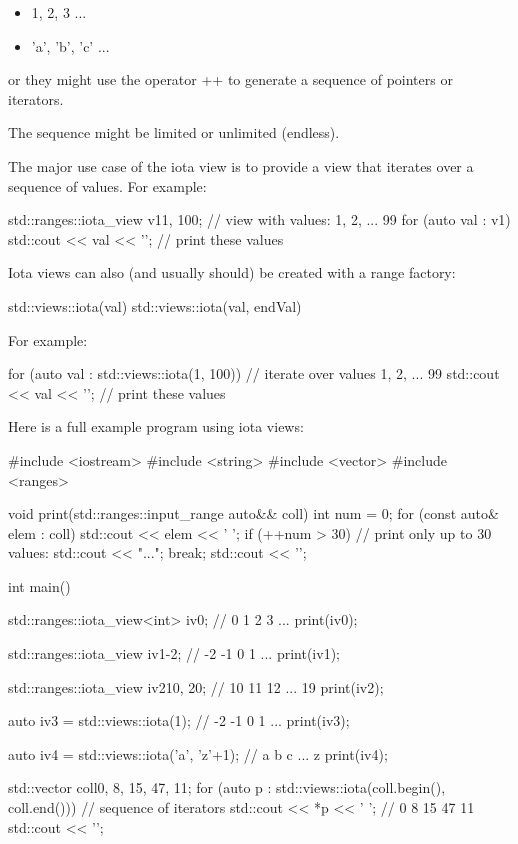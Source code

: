 \begin{itemize}
\item
1, 2, 3 ...

\item
’a’, ’b’, ’c’ ...
\end{itemize}

or they might use the operator ++ to generate a sequence of pointers or iterators.

The sequence might be limited or unlimited (endless).

The major use case of the iota view is to provide a view that iterates over a sequence of values. For example:

\begin{cpp}
std::ranges::iota_view v1{1, 100}; // view with values: 1, 2, ... 99
for (auto val : v1) {
	std::cout << val << '\n'; // print these values
}
\end{cpp}


Iota views can also (and usually should) be created with a range factory:

\begin{cpp}
std::views::iota(val)
std::views::iota(val, endVal)
\end{cpp}

For example:

\begin{cpp}
for (auto val : std::views::iota(1, 100)) { // iterate over values 1, 2, ... 99
	std::cout << val << '\n'; // print these values
}
\end{cpp}

Here is a full example program using iota views:


\begin{cpp}
#include <iostream>
#include <string>
#include <vector>
#include <ranges>

void print(std::ranges::input_range auto&& coll)
{
	int num = 0;
	for (const auto& elem : coll) {
		std::cout << elem << ' ';
		if (++num > 30) { // print only up to 30 values:
			std::cout << "...";
			break;
		}
	}
	std::cout << '\n';
}

int main()
{
	std::ranges::iota_view<int> iv0; // 0 1 2 3 ...
	print(iv0);
	
	std::ranges::iota_view iv1{-2}; // -2 -1 0 1 ...
	print(iv1);
	
	std::ranges::iota_view iv2{10, 20}; // 10 11 12 ... 19
	print(iv2);
	
	auto iv3 = std::views::iota(1); // -2 -1 0 1 ...
	print(iv3);
	
	auto iv4 = std::views::iota('a', 'z'+1); // a b c ... z
	print(iv4);
	
	std::vector coll{0, 8, 15, 47, 11};
	for (auto p : std::views::iota(coll.begin(), coll.end())) { // sequence of iterators
		std::cout << *p << ' '; // 0 8 15 47 11
	}
	std::cout << '\n';
}
\end{cpp}


